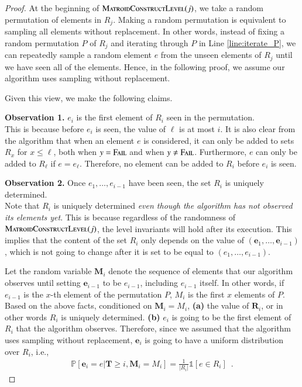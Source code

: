 \documentclass[11pt]{article}
\renewcommand{\Pr}[1]{\ensuremath{\mathbb{P}\left[#1\right]}}
\newcommand{\ind}[1]{\ensuremath{\mathds{1}\left[#1\right]}}
\newcommand{\err}{{\textsc{Fail}}}
\newcommand{\MatroidConstLevel}{\textsc{MatroidConstructLevel}}
\newcommand{\bR}{\ensuremath{\mathbf{R}}}
\newcommand{\bE}{\ensuremath{\mathbf{e}}}
\newcommand{\bT}{\ensuremath{\mathbf{T}}}
\newcommand{\bM}{\ensuremath{\mathbf{M}}}
\begin{document}
\begin{proof}
At the beginning of $\MatroidConstLevel{}(j)$, we take a random permutation of elements in $R_j$. Making a random permutation is equivalent to sampling all elements without replacement. In other words, instead of fixing a random permutation $P$ of $R_j$ and iterating through $P$ in Line \ref{line:iterate_P}, we can repeatedly sample a random element $e$ from the unseen elements of $R_j$ until we have seen all of the elements. 
Hence, in the following proof, we assume our algorithm uses sampling without replacement.

Given this view, we make the following claims.
    
    \textbf{Observation 1.}
    $e_i$ is the first element of $R_i$ seen in the permutation.~\\
            This is because before $e_i$ is seen,
            the value of $\ell$ is at most $i$. It is also clear from the algorithm that when an element $e$ is considered, it can only be added to sets $R_{x}$ for $x\le \ell$, both when $y=\err$ and when $y\ne \err$.
            Furthermore, $e$ can only be added to $R_{\ell}$ if $e=e_{\ell}$. Therefore, no element can be added to $R_i$ before $e_i$ is seen.
            
    \textbf{Observation 2.}
    Once $e_1, \dots, e_{i-1}$ have been seen, the set $R_i$ is uniquely determined.\\
    Note that $R_i$ is uniquely determined \emph{even though the algorithm has not observed its elements yet}. 
    This is because regardless of the randomness of $\MatroidConstLevel{}(j)$, the level invariants will hold after its execution. 
    This implies that the content of the set $R_i$ only depends on the value of $(\bE_1, \dots, \bE_{i - 1})$, which is not going to change after it is set to be equal to $(e_1, \dots, e_{i - 1})$. 
    
    
    Let the random variable $\bM_i$ denote the sequence of elements that our algorithm observes until setting $\bE_{i-1}$ to be $e_{i - 1}$, including $e_{i-1}$ itself.
    In other words, if $e_{i-1}$ is the $x$-th element of the permutation $P$, $M_i$ is the first $x$ elements of $P$.
    ~\\
    Based on the above facts, conditioned on $\bM_i=M_i$, 
    \textbf{(a) }the value of $\bR_i$, or in other words $R_i$ is uniquely determined.
    \textbf{(b)} $e_i$ is going to be the first element of $R_i$ that the algorithm observes. Therefore,
    since we assumed that the algorithm uses sampling without replacement, $\bE_i$ is going to have a uniform distribution over $R_i$, i.e.,
    \begin{align*}
        \Pr{\bE_i = e | 
        \bT \ge i,
        \bM_i = M_i
        }
        = \frac{1}{|R_i|} \ind{e \in R_i} \enspace .
    \end{align*}


\end{proof}
\end{document}
